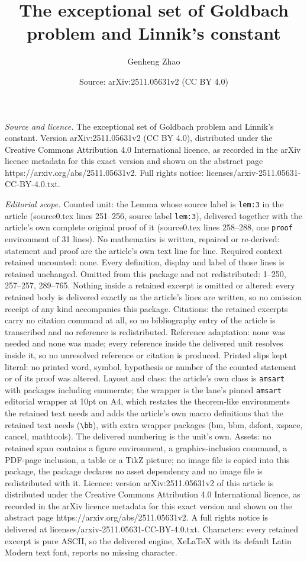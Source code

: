 \documentclass[10pt,a4paper]{amsart}
\title[The exceptional set of Goldbach problem and Linnik's constan]{The exceptional set of Goldbach problem and Linnik's constant}
\author{Genheng Zhao}
\date{Source: arXiv:2511.05631v2 (CC BY 4.0)}
\begin{document}
\maketitle

\noindent\emph{Source and licence.} The exceptional set of Goldbach problem and Linnik's constant. Version arXiv:2511.05631v2 (CC BY 4.0), distributed under the Creative Commons Attribution 4.0 International licence, as recorded in the arXiv licence metadata for this exact version and shown on the abstract page https://arxiv.org/abs/2511.05631v2. Full rights notice: licenses/arxiv-2511.05631-CC-BY-4.0.txt.\par\smallskip

\noindent\textit{Editorial scope.} Counted unit: the Lemma whose source label is \texttt{lem:3} in the article (source0.tex lines 251--256, source label \texttt{lem:3}), delivered together with the article's own complete original proof of it (source0.tex lines 258--288, one \texttt{proof} environment of 31 lines). No mathematics is written, repaired or re-derived: statement and proof are the article's own text line for line. Required context retained uncounted: none. Every definition, display and label of those lines is retained unchanged. Omitted from this package and not redistributed: 1--250, 257--257, 289--765. Nothing inside a retained excerpt is omitted or altered: every retained body is delivered exactly as the article's lines are written, so no omission receipt of any kind accompanies this package. Citations: the retained excerpts carry no citation command at all, so no bibliography entry of the article is transcribed and no reference is redistributed. Reference adaptation: none was needed and none was made; every reference inside the delivered unit resolves inside it, so no unresolved reference or citation is produced. Printed slips kept literal: no printed word, symbol, hypothesis or number of the counted statement or of its proof was altered. Layout and class: the article's own class is \texttt{amsart} with packages including enumerate; the wrapper is the lane's pinned \texttt{amsart} editorial wrapper at 10pt on A4, which restates the theorem-like environments the retained text needs and adds the article's own macro definitions that the retained text needs (\texttt{\textbackslash bb}), with extra wrapper packages (bm, bbm, dsfont, xspace, cancel, mathtools). The delivered numbering is the unit's own. Assets: no retained span contains a figure environment, a graphics-inclusion command, a PDF-page inclusion, a table or a TikZ picture; no image file is copied into this package, the package declares no asset dependency and no image file is redistributed with it. Licence: version arXiv:2511.05631v2 of this article is distributed under the Creative Commons Attribution 4.0 International licence, as recorded in the arXiv licence metadata for this exact version and shown on the abstract page https://arxiv.org/abs/2511.05631v2. A full rights notice is delivered at licenses/arxiv-2511.05631-CC-BY-4.0.txt. Characters: every retained excerpt is pure ASCII, so the delivered engine, XeLaTeX with its default Latin Modern text font, reports no missing character.
\end{document}
